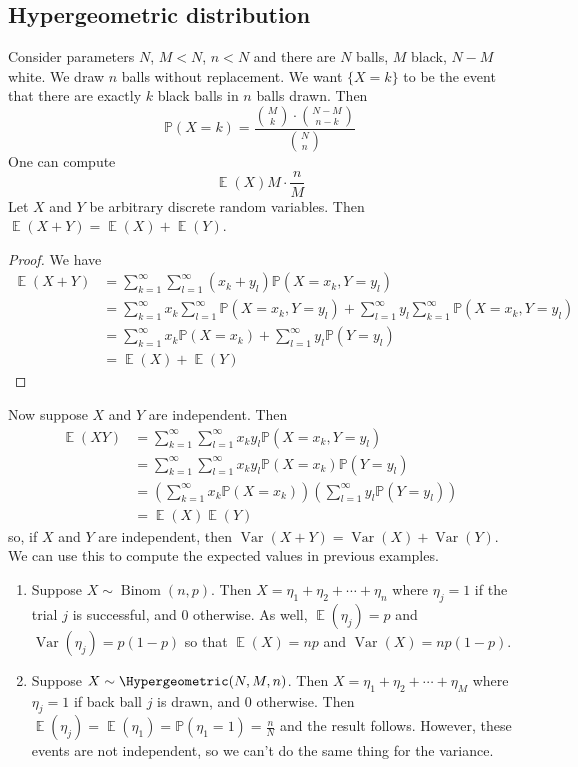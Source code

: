 \documentclass[12pt, a4paper]{book}
\DeclareMathOperator{\E}{\mathbb{E}}
\DeclareMathOperator{\Binom}{Binom}
\DeclareMathOperator{\Var}{Var}
\renewcommand{\Pr}{\mathbb{P}}
\theoremstyle{nonumberplain}
\newtheorem{proof}{Proof}
\begin{document}
\subsection{Hypergeometric distribution}
Consider parameters $N$, $M<N$, $n<N$ and there are $N$ balls, $M$ black, $N-M$ white.
We draw $n$ balls without replacement.
We want $\{X=k\}$ to be the event that there are exactly $k$ black balls in $n$ balls drawn.
Then
\[\Pr(X=k)=\frac{\binom{M}{k}\cdot\binom{N-M}{n-k}}{\binom{N}{n}}\]
One can compute
\[\E(X)M\cdot\frac{n}{M}\]
Let $X$ and $Y$ be arbitrary discrete random variables.
Then $\E(X+Y)=\E(X)+\E(Y)$.
\begin{proof}
    We have
    \begin{align*}
        \E(X+Y)&=\sum\limits_{k=1}^\infty\sum\limits_{l=1}^\infty(x_k+y_l)\Pr(X=x_k,Y=y_l)\\
               &=\sum\limits_{k=1}^\infty x_k\sum\limits_{l=1}^\infty\Pr(X=x_k,Y=y_l)+\sum\limits_{l=1}^\infty y_l\sum\limits_{k=1}^\infty\Pr(X=x_k,Y=y_l)\\
               &=\sum\limits_{k=1}^\infty x_k\Pr(X=x_k)+\sum\limits_{l=1}^\infty y_l\Pr(Y=y_l)\\
               &= \E(X)+\E(Y)
    \end{align*}
\end{proof}
Now suppose $X$ and $Y$ are independent.
Then
\begin{align*}
    \E(XY) &= \sum\limits_{k=1}^\infty\sum\limits_{l=1}^\infty x_ky_l\Pr(X=x_k,Y=y_l)\\
           &= \sum\limits_{k=1}^\infty\sum\limits_{l=1}^\infty x_ky_l\Pr(X=x_k)\Pr(Y=y_l)\\
           &= \left(\sum\limits_{k=1}^\infty x_k\Pr(X=x_k)\right)\left(\sum\limits_{l=1}^\infty y_l\Pr(Y=y_l)\right)\\
           &=\E(X)\E(Y)
\end{align*}
so, if $X$ and $Y$ are independent, then $\Var(X+Y)=\Var(X)+\Var(Y)$.
We can use this to compute the expected values in previous examples.
\begin{enumerate}
    \item Suppose $X\sim\Binom(n,p)$.
        Then $X=\eta_1+\eta_2+\cdots+\eta_n$ where $\eta_j=1$ if the trial $j$ is successful, and 0 otherwise.
        As well, $\E(\eta_j)=p$ and $\Var(\eta_j)=p(1-p)$ so that $\E(X)=np$ and $\Var(X)=np(1-p)$.
    \item Suppose $X\sim\Hypergeometric(N,M,n)$.
        Then $X=\eta_1+\eta_2+\cdots+\eta_M$ where $\eta_j=1$ if back ball $j$ is drawn, and $0$ otherwise.
        Then $\E(\eta_j)=\E(\eta_1)=\Pr(\eta_1=1)=\frac{n}{N}$ and the result follows.
        However, these events are not independent, so we can't do the same thing for the variance.
\end{enumerate}
\end{document}
